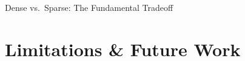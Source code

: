 \documentclass[aspectratio=169, 11pt]{beamer}
\begin{document}
\begin{frame}{Dense vs.\ Sparse: The Fundamental Tradeoff}
\end{frame}

\section{Limitations \& Future Work}
\end{document}
